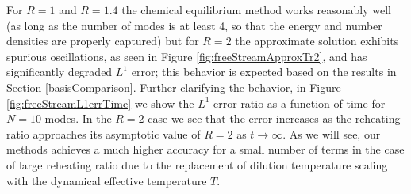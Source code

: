 For $R=1$ and $R=1.4$  the chemical equilibrium method works reasonably well (as long as the number of modes is at least 4, so that the energy and number densities are properly captured) but for $R=2$ the approximate solution exhibits spurious oscillations, as seen in Figure \ref{fig:freeStreamApproxTr2}, and has significantly degraded $L^1$ error;  this behavior is expected based on the results in Section \ref{basisComparison}. Further clarifying the behavior, in Figure \ref{fig:freeStreamL1errTime}  we show the $L^1$ error ratio as a function of time for $N=10$ modes. In the $R=2$ case we see that the error increases as the reheating ratio approaches its asymptotic value of $R=2$ as $t\rightarrow\infty$.  As we will see, our methods achieves a much higher accuracy for a small number of terms in the case of large reheating ratio due to the replacement of dilution temperature scaling with the dynamical effective temperature $T$.  



